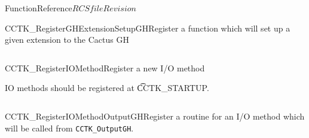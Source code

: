 \begin{cactuspart}{FunctionReference}{$RCSfile$}{$Revision$}
\begin{CCTKFunc}{CCTK\_RegisterGHExtensionSetupGH}{Register a function which will set up a given extension to the Cactus GH}
\label{CCTK-RegisterGHExtensionSetupGH}
\showcargs
\begin{params}
\end{params}
\begin{discussion}
\end{discussion}
\begin{examples}
\begin{tabular}{@{}p{3cm}cp{11cm}}
\end{tabular}
\end{examples}
\begin{errorcodes}
\end{errorcodes}
\end{CCTKFunc}

\begin{CCTKFunc}{CCTK\_RegisterIOMethod}{Register a new I/O method}
\label{CCTK-RegisterIOMethod}
\showargs
\begin{params}
\end{params}
\begin{discussion}
IO methods should be registered at {\t CCTK\_STARTUP}.
\end{discussion}
\begin{examples}
\begin{tabular}{@{}p{3cm}cp{11cm}}
\end{tabular}
\end{examples}
\begin{errorcodes}
\end{errorcodes}
\end{CCTKFunc}


\begin{CCTKFunc}{CCTK\_RegisterIOMethodOutputGH}{Register a routine for an I/O method which will be called from {\tt CCTK\_OutputGH}.}
\label{CCTK-RegisterIOMethodOutputGH}
\showcargs
\begin{params}
\end{params}
\begin{discussion}
\end{discussion}
\begin{examples}
\begin{tabular}{@{}p{3cm}cp{11cm}}
\end{tabular}
\end{examples}
\begin{errorcodes}
\end{errorcodes}
\end{CCTKFunc}



\end{cactuspart}
